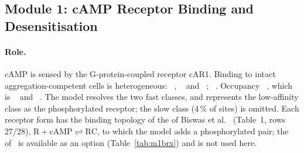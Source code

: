 \subsection{Module 1: cAMP Receptor Binding and Desensitisation}\label{sec:m1}

\paragraph{Role.}
cAMP is sensed by the G-protein-coupled receptor cAR1.
Binding to intact aggregation-competent cells is heterogeneous: ~\cite{vanhaastert1984}, ~\cite{vanhaastert1984} and ~\cite{vanhaastert1984}; ~\cite{vanhaastert1984}.
Occupancy ~\cite{vaughan1988,hereld1994}, which is ~\cite{caterina1995a,caterina1995b} and ~\cite{caterina1995a,caterina1995b}.
The model resolves the two fast classes, and represents the low-affinity class as the phosphorylated receptor; the slow class (4\,\% of sites) is omitted.
Each receptor form has the binding topology of the  of Biswas et al.~\cite{biswas2021} (Table~1, rows 27/28), $\mathrm R+\mathrm{cAMP}\rightleftharpoons\mathrm{RC}$, to which the model adds a phosphorylated pair; the  of~\cite{biswas2021} is available as an option (Table~\ref{tab:m1brx}) and is not used here.





